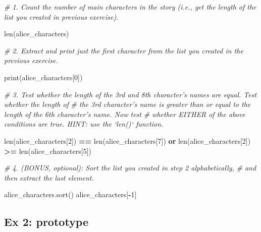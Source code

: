 \documentclass[
]{book}
\newenvironment{Shaded}{\begin{snugshade}}{\end{snugshade}}
\newcommand{\BuiltInTok}[1]{#1}
\newcommand{\CommentTok}[1]{\textcolor[rgb]{0.56,0.35,0.01}{\textit{#1}}}
\newcommand{\DecValTok}[1]{\textcolor[rgb]{0.00,0.00,0.81}{#1}}
\newcommand{\KeywordTok}[1]{\textcolor[rgb]{0.13,0.29,0.53}{\textbf{#1}}}
\newcommand{\NormalTok}[1]{#1}
\newcommand{\OperatorTok}[1]{\textcolor[rgb]{0.81,0.36,0.00}{\textbf{#1}}}
\begin{document}
\begin{Shaded}
\begin{Highlighting}[]
\CommentTok{# 1. Count the number of main characters in the story (i.e., get the length of the list you created in previous exercise).}

\BuiltInTok{len}\NormalTok{(alice_characters)}

\CommentTok{# 2. Extract and print just the first character from the list you created in the previous exercise.}

\BuiltInTok{print}\NormalTok{(alice_characters[}\DecValTok{0}\NormalTok{])}

\CommentTok{# 3. Test whether the length of the 3rd and 8th character's names are equal. Test whether the length of}
\CommentTok{# the 3rd character's name is greater than or equal to the length of the 6th character's name. Now test}
\CommentTok{# whether EITHER of the above conditions are true. HINT: use the `len()` function.}

\BuiltInTok{len}\NormalTok{(alice_characters[}\DecValTok{2}\NormalTok{]) }\OperatorTok{==} \BuiltInTok{len}\NormalTok{(alice_characters[}\DecValTok{7}\NormalTok{]) }\KeywordTok{or} \BuiltInTok{len}\NormalTok{(alice_characters[}\DecValTok{2}\NormalTok{]) }\OperatorTok{>=} \BuiltInTok{len}\NormalTok{(alice_characters[}\DecValTok{5}\NormalTok{])}


\CommentTok{# 4. (BONUS, optional): Sort the list you created in step 2 alphabetically,}
\CommentTok{# and then extract the last element.}

\NormalTok{alice_characters.sort()}
\NormalTok{alice_characters[}\OperatorTok{-}\DecValTok{1}\NormalTok{]}
\end{Highlighting}
\end{Shaded}

\hypertarget{ex-2-prototype-3}{%
\subsection{Ex 2: prototype}\label{ex-2-prototype-3}}
\end{document}
